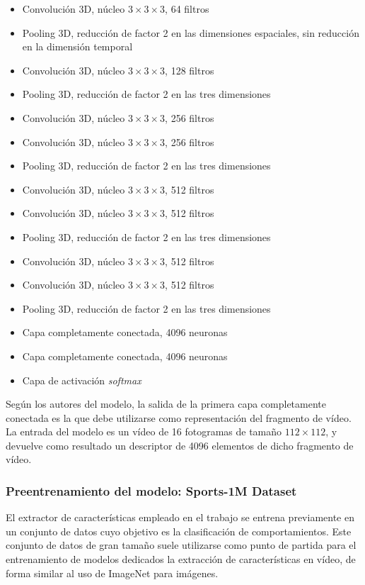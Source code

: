 \documentclass[../main.tex]{memoir}
\begin{document}
\begin{itemize}
\item Convolución 3D, núcleo $3 \times 3 \times 3$, 64 filtros
\item Pooling 3D, reducción de factor 2 en las dimensiones espaciales,
  sin reducción en la dimensión temporal
\item Convolución 3D, núcleo $3 \times 3 \times 3$, 128 filtros
\item Pooling 3D, reducción de factor 2 en las tres dimensiones
\item Convolución 3D, núcleo $3 \times 3 \times 3$, 256 filtros
\item Convolución 3D, núcleo $3 \times 3 \times 3$, 256 filtros
\item Pooling 3D, reducción de factor 2 en las tres dimensiones
\item Convolución 3D, núcleo $3 \times 3 \times 3$, 512 filtros
\item Convolución 3D, núcleo $3 \times 3 \times 3$, 512 filtros
\item Pooling 3D, reducción de factor 2 en las tres dimensiones
\item Convolución 3D, núcleo $3 \times 3 \times 3$, 512 filtros
\item Convolución 3D, núcleo $3 \times 3 \times 3$, 512 filtros
\item Pooling 3D, reducción de factor 2 en las tres dimensiones
\item Capa completamente conectada, 4096 neuronas
\item Capa completamente conectada, 4096 neuronas
\item Capa de activación \textit{softmax}
\end{itemize}

Según los autores del modelo, la salida de la primera capa
completamente conectada es la que debe utilizarse como representación
del fragmento de vídeo. La entrada del modelo es un vídeo de 16
fotogramas de tamaño $112 \times 112$, y devuelve como resultado
un descriptor de 4096 elementos de dicho fragmento de vídeo.

\subsubsection{Preentrenamiento del modelo: Sports-1M Dataset}

El extractor de características empleado en el trabajo se entrena
previamente en un conjunto de datos cuyo objetivo es la clasificación
de comportamientos. Este conjunto de datos de gran tamaño suele
utilizarse como punto de partida para el entrenamiento de modelos
dedicados la extracción de características en vídeo, de forma similar
al uso de ImageNet para imágenes.\\
\end{document}
